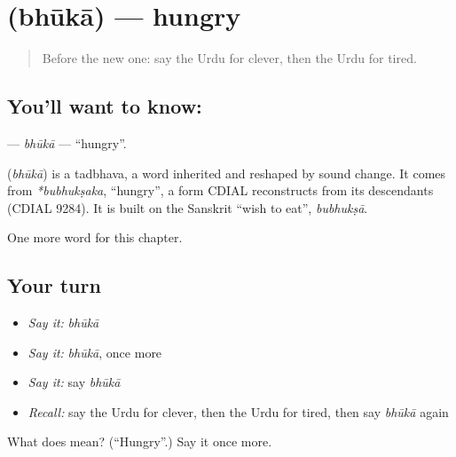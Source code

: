 \section[\texorpdfstring{\ur{بھوکا} (bhūkā)}{بھوکا (bhūkā)}]{ (bhūkā) — hungry}

\label{lesson:UR-C135-bhuka}



\begin{quote}
Before the new one: say the Urdu for clever, then the Urdu for tired.
\end{quote}

\subsection*{You'll want to know: }
\textbf{} — \emph{bhūkā} — \textquotedblleft{}hungry\textquotedblright{}.

\begin{cousinweb}
\textbf{} (\emph{bhūkā}) is a tadbhava, a word inherited and reshaped by sound change. It comes from \emph{*bubhukṣaka}, \textquotedblleft{}hungry\textquotedblright{}, a form CDIAL reconstructs from its descendants (CDIAL 9284). It is built on the Sanskrit \textquotedblleft{}wish to eat\textquotedblright{}, \emph{bubhukṣā}.
\end{cousinweb}

\begin{grammarlens}[title={What you've built}]
One more word for this chapter.
\end{grammarlens}

\subsection*{Your turn}
\begin{itemize}
\raggedright
  \item \emph{Say it:} \emph{bhūkā}
  \item \emph{Say it:} \emph{bhūkā}, once more
  \item \emph{Say it:} say \emph{bhūkā}
  \item \emph{Recall:} say the Urdu for clever, then the Urdu for tired, then say \emph{bhūkā} again
\end{itemize}

\begin{tcolorbox}[breakable,colback=teal!4,colframe=teal!35!black,title={Before you move on}]
What does  mean? (\textquotedblleft{}Hungry\textquotedblright{}.) Say it once more.
\end{tcolorbox}
